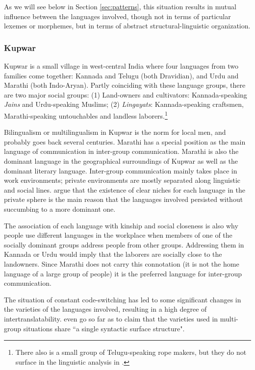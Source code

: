 \documentclass[output=paper,
modfonts
]{langscibook}
\begin{document}
As we will see below in Section \ref{sec:patterns}, this situation results in mutual influence between the languages involved, though not in terms of particular lexemes or morphemes, but in terms of abstract structural-linguistic organization.


\subsubsection*{Kupwar}

\noindent Kupwar \parencite{gumperzetal1971convergence} is a small village in west-central India where four languages from two families come together: Kannada and Telugu (both Dravidian), and Urdu and Marathi (both Indo-Aryan). Partly coinciding with these language groups, there are two major social groups: (1) Land-owners and cultivators: Kannada-speaking \textit{Jains} and Urdu-speaking Muslims; (2) \textit{Lingayats}: Kannada-speaking craftsmen, Marathi-speaking untouchables and landless laborers.\footnote{There also is a small group of Telugu-speaking rope makers, but they do not surface in the linguistic analysis in \cite{gumperzetal1971convergence}.}

Bilingualism or multilingualism in Kupwar is the norm for local men, and probably goes back several centuries. Marathi has a special position as the main language of communication in inter-group communication. Marathi is also the dominant language in the geographical surroundings of Kupwar as well as the dominant literary language. Inter-group communication mainly takes place in work environments; private environments are mostly separated along linguistic and social lines. \textcite{gumperzetal1971convergence} argue that the existence of clear niches for each language in the private sphere is the main reason that the languages involved persisted without succumbing to a more dominant one.

The association of each language with kinship and social closeness is also why people use different languages in the workplace when members of one of the socially dominant groups address people from other groups. Addressing them in Kannada or Urdu would imply that the laborers are socially close to the landowners. Since Marathi does not carry this connotation (it is not the home language of a large group of people) it is the preferred language for inter-group communication.

The situation of constant code-switching has led to some significant changes in the varieties of the languages involved, resulting in a high degree of intertranslatability. \textcite[155]{gumperzetal1971convergence} even go so far as to claim that the varieties used in multi-group situations share ``a single syntactic surface structure".
\end{document}
